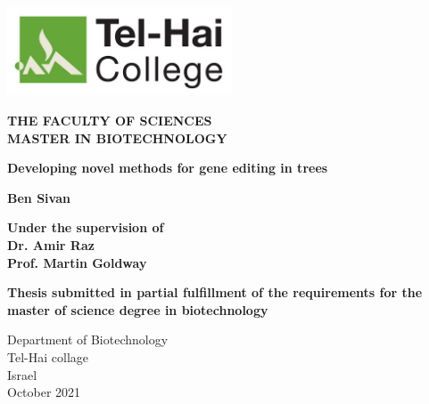\documentclass[
]{article}
\begin{document}
\begin{titlepage}
   \begin{center}
       
        \includegraphics[width=0.5\textwidth]{telhai logo.jpg}
        
        \vspace{0.5cm}

       \textbf{\Huge THE FACULTY OF SCIENCES\\ MASTER IN BIOTECHNOLOGY}

       \vspace{2cm}
       \textbf{\huge Developing novel methods for gene editing in trees}
            
       \vspace{3cm}

       \textbf{\Large Ben Sivan}
       
        \vspace{1cm}

       \textbf{\large Under the supervision of\\
       Dr. Amir Raz\\
       Prof. Martin Goldway}
       
       \vspace{1cm}

       \textbf{\large Thesis submitted in partial fulfillment of the requirements for the master of science degree in biotechnology}
       
       \vfill
     
       Department of Biotechnology\\
       Tel-Hai collage\\
       Israel\\
       October 2021
            
   \end{center}
\end{titlepage}

\newpage

\setcounter{tocdepth}{3}
\tableofcontents
\newpage

\listoffigures
\newpage

\listoftables
\newpage

\setcounter{page}{7}
\end{document}
